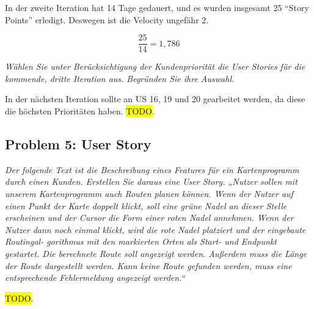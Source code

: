 \documentclass[
  ngerman,
  DIV=14
]{scrartcl}
\begin{document}
\medskip\noindent
In der zweite Iteration hat 14 Tage gedauert, und es wurden insgesamt 25 \enquote{Story Points} erledigt. Deswegen ist die Velocity ungefähr $2$.

\begin{equation*}
\frac{25}{14} = 1,786  
\end{equation*}

\bigskip\noindent
\emph{Wählen Sie unter Berücksichtigung der Kundenpriorität die User Stories für die kommende, dritte Iteration aus. Begründen Sie ihre Auswahl.}

\medskip\noindent
In der nächsten Iteration sollte an US 16, 19 und 20 gearbeitet werden, da diese die höchsten Prioritäten haben. \hl{TODO}.

\subsection*{Problem 5: User Story}
\emph{Der folgende Text ist die Beschreibung eines Features für ein Kartenprogramm durch einen Kunden. Erstellen Sie daraus eine User Story.
„Nutzer sollen mit unserem Kartenprogramm auch Routen planen können. Wenn der Nutzer auf einen Punkt der Karte doppelt klickt, soll eine grüne Nadel an dieser Stelle erscheinen und der Cursor die Form einer roten Nadel annehmen. Wenn der Nutzer dann noch einmal klickt, wird die rote Nadel platziert und der eingebaute Routingal- gorithmus mit den markierten Orten als Start- und Endpunkt gestartet. Die berechnete Route soll angezeigt werden. Außerdem muss die Länge der Route dargestellt werden. Kann keine Route gefunden werden, muss eine entsprechende Fehlermeldung angezeigt werden.“}

\medskip\noindent
\hl{TODO}.
\end{document}
